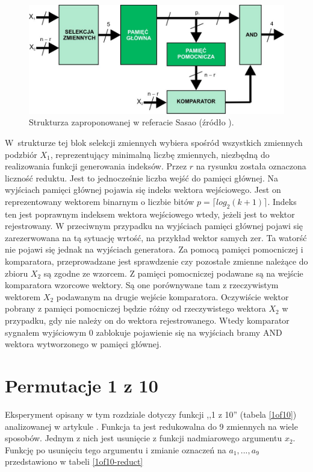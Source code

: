 \begin{figure}[H]
\centering
\includegraphics[width = 13cm]{chapter04/sasao-structure.jpg}
\caption{Strukturza zaproponowanej w referacie Sasao (źródło \cite{sasao-workshop}).}
\label{fig:sasao-structure}
\end{figure}

W~strukturze tej blok selekcji zmiennych wybiera spośród wszystkich zmiennych podzbiór $X_1$,
reprezentujący minimalną liczbę zmiennych,
niezbędną do realizowania funkcji generowania indeksów.
Przez $r$ na rysunku została oznaczona liczność reduktu.
Jest to jednocześnie liczba wejść do pamięci głównej.
Na wyjściach pamięci głównej pojawia się indeks wektora wejściowego. %
Jest on reprezentowany wektorem binarnym o liczbie bitów $p = \lceil log_2 (k+1)\rceil$.
Indeks ten jest poprawnym indeksem wektora wejściowego wtedy,
jeżeli jest to wektor rejestrowany.
W przeciwnym przypadku na wyjściach pamięci głównej pojawi się zarezerwowana na tą sytuację wrtość,
na przykład wektor samych zer.
Ta watorść nie pojawi się jednak na wyjściach generatora.
Za pomocą pamięci pomocniczej i komparatora,
przeprowadzane jest sprawdzenie czy pozostałe zmienne należące do zbioru $X_2$ są zgodne ze wzorcem.
Z pamięci pomocniczej podawane są na wejście komparatora wzorcowe wektory.
Są one porównywane tam z rzeczywistym wektorem $X_2$ podawanym na drugie wejście komparatora.
Oczywiście wektor pobrany z pamięci pomocniczej będzie różny od rzeczywistego wektora $X_2$ w przypadku,
gdy nie należy on do wektora rejestrowanego.
Wtedy komparator sygnałem wyjściowym 0 zablokuje pojawienie się na wyjściach bramy AND wektora wytworzonego w pamięci głównej.

\section{Permutacje 1 z 10}

Eksperyment opisany w tym rozdziale dotyczy funkcji ,,1 z 10'' (tabela \ref{1of10}) analizowanej w artykule \cite{sasao-s-min}.
Funkcja ta jest redukowalna do 9 zmiennych na wiele sposobów.
Jednym z nich jest usunięcie z funkcji nadmiarowego argumentu $x_2$.
Funkcję po usunięciu tego argumentu i zmianie oznaczeń na $a_1, ..., a_9$ przedstawiono w tabeli \ref{1of10-reduct}

